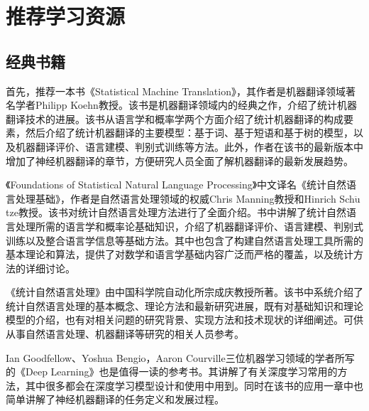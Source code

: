 
\sectionnewpage
\section{推荐学习资源}

\subsection{经典书籍}

\parinterval 首先，推荐一本书《Statistical Machine Translation》\cite{koehn2009statistical}，其作者是机器翻译领域著名学者Philipp Koehn教授。该书是机器翻译领域内的经典之作，介绍了统计机器翻译技术的进展。该书从语言学和概率学两个方面介绍了统计机器翻译的构成要素，然后介绍了统计机器翻译的主要模型：基于词、基于短语和基于树的模型，以及机器翻译评价、语言建模、判别式训练等方法。此外，作者在该书的最新版本中增加了神经机器翻译的章节，方便研究人员全面了解机器翻译的最新发展趋势\cite{DBLP:journals/corr/abs-1709-07809}。

\parinterval 《Foundations of Statistical Natural Language Processing》\cite{manning1999foundations}中文译名《统计自然语言处理基础》，作者是自然语言处理领域的权威Chris Manning教授和Hinrich Sch$\ddot{\textrm{u}}$tze教授。该书对统计自然语言处理方法进行了全面介绍。书中讲解了统计自然语言处理所需的语言学和概率论基础知识，介绍了机器翻译评价、语言建模、判别式训练以及整合语言学信息等基础方法。其中也包含了构建自然语言处理工具所需的基本理论和算法，提供了对数学和语言学基础内容广泛而严格的覆盖，以及统计方法的详细讨论。

\parinterval 《统计自然语言处理》\cite{宗成庆2013统计自然语言处理}由中国科学院自动化所宗成庆教授所著。该书中系统介绍了统计自然语言处理的基本概念、理论方法和最新研究进展，既有对基础知识和理论模型的介绍，也有对相关问题的研究背景、实现方法和技术现状的详细阐述。可供从事自然语言处理、机器翻译等研究的相关人员参考。

\parinterval  Ian Goodfellow、Yoshua Bengio，Aaron Courville三位机器学习领域的学者所写的《Deep Learning》\cite{Goodfellow-et-al-2016}也是值得一读的参考书。其讲解了有关深度学习常用的方法，其中很多都会在深度学习模型设计和使用中用到。同时在该书的应用一章中也简单讲解了神经机器翻译的任务定义和发展过程。


